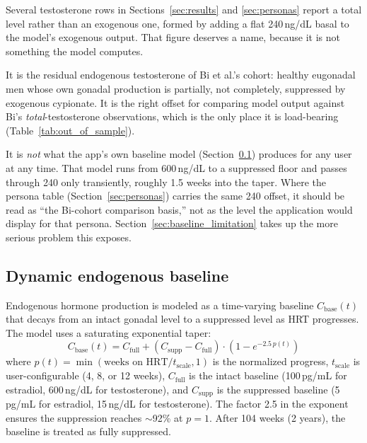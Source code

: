 \documentclass[11pt,a4paper]{article}
\begin{document}
Several testosterone rows in Sections~\ref{sec:results} and
\ref{sec:personas} report a total level rather than an exogenous one, formed
by adding a flat 240\,ng/dL basal to the model's exogenous output. That
figure deserves a name, because it is not something the model computes.

It is the residual endogenous testosterone of Bi et al.'s cohort: healthy
eugonadal men whose own gonadal production is partially, not completely,
suppressed by exogenous cypionate. It is the right offset for comparing
model output against Bi's \emph{total}-testosterone observations, which is
the only place it is load-bearing (Table~\ref{tab:out_of_sample}).

It is \emph{not} what the app's own baseline model
(Section~\ref{sec:baseline}) produces for any user at any time. That model
runs from 600\,ng/dL to a suppressed floor and passes through 240 only
transiently, roughly 1.5 weeks into the taper. Where the persona table
(Section~\ref{sec:personas}) carries the same 240 offset, it should be read
as ``the Bi-cohort comparison basis,'' not as the level the application
would display for that persona. Section~\ref{sec:baseline_limitation} takes
up the more serious problem this exposes.

\subsection{Dynamic endogenous baseline}
\label{sec:baseline}

Endogenous hormone production is modeled as a time-varying baseline
$C_{\text{base}}(t)$ that decays from an intact gonadal level to a
suppressed level as HRT progresses. The model uses a saturating
exponential taper:
\begin{equation}
C_{\text{base}}(t) = C_{\text{full}} + (C_{\text{supp}} - C_{\text{full}}) \cdot \left(1 - e^{-2.5 \, p(t)}\right)
\label{eq:baseline}
\end{equation}
where $p(t) = \min(\text{weeks on HRT} / t_{\text{scale}}, 1)$ is the
normalized progress, $t_{\text{scale}}$ is user-configurable (4, 8, or
12 weeks), $C_{\text{full}}$ is the intact baseline (100\,pg/mL for
estradiol, 600\,ng/dL for testosterone), and $C_{\text{supp}}$ is the
suppressed baseline (5\,pg/mL for estradiol, 15\,ng/dL for
testosterone). The factor 2.5 in the exponent ensures the suppression
reaches $\sim$92\% at $p = 1$. After 104 weeks (2 years), the baseline
is treated as fully suppressed.
\end{document}

